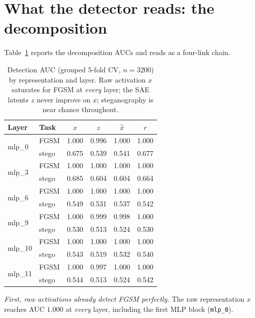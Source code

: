 \documentclass[../ppgc-tese.tex]{subfiles}
\begin{document}
\section{What the detector reads: the decomposition}
\label{sec:adv-decomp-results}
Table~\ref{tab:adv-decomp} reports the decomposition AUCs and reads as a four-link
chain.

\begin{table}[ht]
  \centering
  \caption{Detection AUC (grouped 5-fold CV, $n{=}3200$) by representation and
  layer. Raw activation $x$ saturates for FGSM at \emph{every} layer; the SAE
  latents $z$ never improve on $x$; steganography is near chance throughout.}
  \label{tab:adv-decomp}
  \begin{tabular}{llcccc}
    \toprule
    Layer & Task & $x$ & $z$ & $\hat{x}$ & $r$ \\
    \midrule
    \multirow{2}{*}{mlp\_0}  & FGSM  & 1.000 & 0.996 & 1.000 & 1.000 \\
                             & stego & 0.675 & 0.539 & 0.541 & 0.677 \\
    \multirow{2}{*}{mlp\_3}  & FGSM  & 1.000 & 1.000 & 1.000 & 1.000 \\
                             & stego & 0.685 & 0.604 & 0.604 & 0.664 \\
    \multirow{2}{*}{mlp\_6}  & FGSM  & 1.000 & 1.000 & 1.000 & 1.000 \\
                             & stego & 0.549 & 0.531 & 0.537 & 0.542 \\
    \multirow{2}{*}{mlp\_9}  & FGSM  & 1.000 & 0.999 & 0.998 & 1.000 \\
                             & stego & 0.530 & 0.513 & 0.524 & 0.530 \\
    \multirow{2}{*}{mlp\_10} & FGSM  & 1.000 & 1.000 & 1.000 & 1.000 \\
                             & stego & 0.543 & 0.519 & 0.532 & 0.540 \\
    \multirow{2}{*}{mlp\_11} & FGSM  & 1.000 & 0.997 & 1.000 & 1.000 \\
                             & stego & 0.544 & 0.513 & 0.524 & 0.542 \\
    \bottomrule
  \end{tabular}
\end{table}

\emph{First, raw activations already detect FGSM perfectly.} The raw representation
$x$ reaches AUC $1.000$ at \emph{every} layer, including the first MLP block
(\texttt{mlp\_0}).
\end{document}
